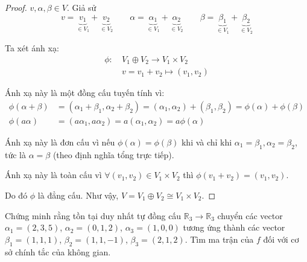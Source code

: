 \begin{proof}
    $v, \alpha, \beta \in V$. Giả sử
    \[
        v = \underbrace{v_{1}}_{\in V_{1}} + \underbrace{v_{2}}_{\in V_{2}}
        \qquad
        \alpha = \underbrace{\alpha_{1}}_{\in V_{1}} + \underbrace{\alpha_{2}}_{\in V_{2}}
        \qquad
        \beta = \underbrace{\beta_{1}}_{\in V_{1}} + \underbrace{\beta_{2}}_{\in V_{2}}
    \]
    
    Ta xét ánh xạ:
    \[
        \begin{split}
            \phi:\  & V_{1}\oplus V_{2} \to V_{1}\times V_{2}  \\
                    & v = v_{1} + v_{2} \mapsto (v_{1}, v_{2})
        \end{split}
    \]
    
    Ánh xạ này là một đồng cấu tuyến tính vì:
    \[
        \begin{split}
            \phi(\alpha + \beta) & = (\alpha_{1} + \beta_{1}, \alpha_{2} + \beta_{2}) = (\alpha_{1}, \alpha_{2}) + (\beta_{1}, \beta_{2}) = \phi(\alpha) + \phi(\beta) \\
            \phi(a\alpha)        & = (a\alpha_{1}, a\alpha_{2}) = a(\alpha_{1}, \alpha_{2}) = a\phi(\alpha)
        \end{split}
    \]
    
    Ánh xạ này là đơn cấu vì nếu $\phi(\alpha) = \phi(\beta)$ khi và chỉ khi $\alpha_{1} = \beta_{1}, \alpha_{2} = \beta_{2}$, tức là $\alpha = \beta$ (theo định nghĩa tổng trực tiếp).
    
    Ánh xạ này là toàn cấu vì $\forall (v_{1}, v_{2})\in V_{1}\times V_{2}$ thì $\phi(v_{1} + v_{2}) = (v_{1}, v_{2})$.
    
    Do đó $\phi$ là đẳng cấu. Như vậy, $V = V_{1}\oplus V_{2} \cong V_{1}\times V_{2}$.
\end{proof}

\begin{exercise}
    Chứng minh rằng tồn tại duy nhất tự đồng cấu $\mathbb{R}_{3}\to\mathbb{R}_{3}$ chuyển các vector $\alpha_{1} = (2,3,5)$, $\alpha_{2} = (0, 1, 2)$, $\alpha_{3} = (1, 0, 0)$ tương ứng thành các vector $\beta_{1} = (1, 1, 1)$, $\beta_{2} = (1, 1, -1)$, $\beta_{3} = (2, 1, 2)$. Tìm ma trận của $f$ đối với cơ sở chính tắc của không gian.
\end{exercise}

